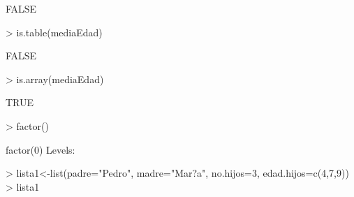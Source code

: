 \documentclass{article}
\begin{document}
\begin{Schunk}
\begin{Soutput}
[1] FALSE
\end{Soutput}
\begin{Sinput}
> is.table(mediaEdad)
\end{Sinput}
\begin{Soutput}
[1] FALSE
\end{Soutput}
\begin{Sinput}
> is.array(mediaEdad)
\end{Sinput}
\begin{Soutput}
[1] TRUE
\end{Soutput}
\begin{Sinput}
> factor()
\end{Sinput}
\begin{Soutput}
factor(0)
Levels: 
\end{Soutput}
\begin{Sinput}
> lista1<-list(padre="Pedro", madre="Mar?a", no.hijos=3, edad.hijos=c(4,7,9))
> lista1
\end{Sinput}
\end{Schunk}
\end{document}
